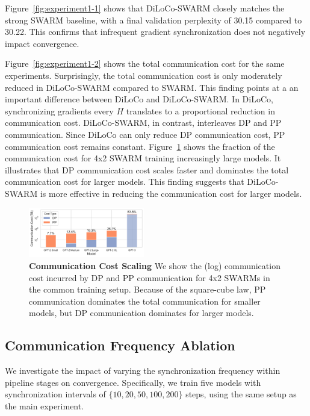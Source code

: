 \documentclass{article}
\begin{document}
Figure~\ref{fig:experiment1-1} shows that DiLoCo-SWARM closely matches the strong SWARM baseline, with a final validation perplexity of 30.15 compared to 30.22. This confirms that infrequent gradient synchronization does not negatively impact convergence.

Figure~\ref{fig:experiment1-2} shows the total communication cost for the same
experiments. Surprisingly, the total communication cost is only moderately reduced in DiLoCo-SWARM compared to SWARM. This finding points at a an important difference between DiLoCo and DiLoCo-SWARM. In DiLoCo, synchronizing gradients every $H$ translates to a proportional reduction in communication cost. DiLoCo-SWARM, in contrast, interleaves DP and PP communication. Since
DiLoCo can only reduce DP communication cost, PP communication cost remains
constant. Figure~\ref{fig:communication-cost-scaling} shows the fraction of the communication cost for 4x2 SWARM training increasingly large models. It illustrates that DP communication cost scales faster and dominates the total communication cost for larger models. This finding suggests that DiLoCo-SWARM is more effective in reducing the communication cost for larger models.

\begin{figure}[ht]
  \centering
  \includegraphics[width=0.45\textwidth]{figures/square-cube-law.pdf}
  \caption{\textbf{Communication Cost Scaling} We show the (log) communication
  cost incurred by DP and PP communication for 4x2 SWARMs in the common training
  setup. Because of the square-cube law, PP communication dominates the total communication for smaller models, but DP communication dominates for larger models.} 
  \label{fig:communication-cost-scaling}
\end{figure}

\subsection{Communication Frequency Ablation}

We investigate the impact of varying the synchronization frequency within pipeline stages on convergence. Specifically, we train five models with synchronization intervals of $\{10, 20, 50, 100, 200\}$ steps, using the same setup as the main experiment.
\end{document}
